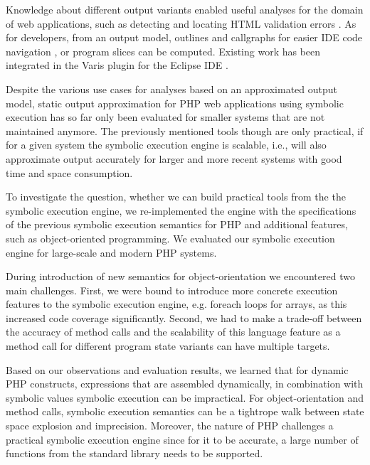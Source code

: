 \documentclass[preprint]{sig-alternate-05-2015}
\begin{document}

Knowledge about different output variants enabled useful analyses
for the domain of web applications, such as detecting and locating HTML
validation errors \cite{Nguyen:2011:AFH:2190078.2190142}. As for developers,
from an output model, outlines and callgraphs for easier IDE code navigation
\cite{Nguyen:2014:BCG:2635868.2635928}, or program slices
\cite{Nguyen:2015:CPS:2786805.2786872} can be computed. Existing work has been
integrated in the Varis plugin for the Eclipse IDE \cite{Nguyen:2015:VIS:2819009.2819140}.

Despite the various use cases for analyses based on an approximated output
model, static output approximation for PHP web applications using symbolic
execution has so far only been evaluated for smaller systems that are not
maintained anymore. The previously mentioned tools though are only practical, if
for a given system the symbolic execution engine is scalable, i.e., will also
approximate output accurately for larger and more recent systems with good time
and space consumption.

To investigate the question, whether we can build practical tools from the
the symbolic execution engine, we re-implemented the engine with the specifications
of the previous symbolic execution semantics
\cite{Nguyen:2014:BCG:2635868.2635928} for PHP and additional features, such as
object-oriented programming. We evaluated our
symbolic execution engine for large-scale and modern PHP systems.

During introduction of new semantics for object-orientation we encountered two main challenges. 
First, we were bound to introduce more concrete execution features to the symbolic execution engine, e.g. foreach loops for arrays, as this increased code coverage significantly. Second, we had to make a trade-off between the accuracy
of method calls and the scalability of this language feature as a method call
for different program state variants can have multiple targets.

Based on our observations and evaluation results, we learned that for dynamic
PHP constructs, expressions that are assembled dynamically, in combination with
symbolic values symbolic execution can be impractical. For object-orientation
and method calls, symbolic execution semantics can be a tightrope walk between
state space explosion and imprecision. Moreover, the nature of PHP challenges a
practical symbolic execution engine since for it to be accurate, a large number
of functions from the standard library needs to be supported.
\end{document}
